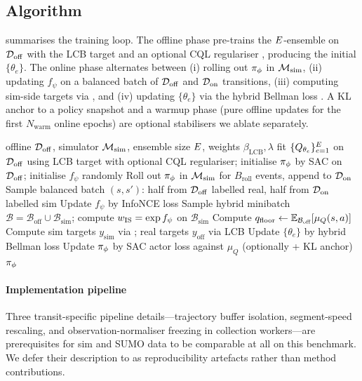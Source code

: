 \subsection{Algorithm}
\label{sec:method:algo}

 summarises the training loop.
The offline phase pre-trains the $E$-ensemble on $\mathcal{D}_{\mathrm{off}}$ with the LCB target and an optional CQL regulariser \citep{kumar2020cql}, producing the initial $\{\theta_e\}$.
The online phase alternates between (i) rolling out $\pi_\phi$ in $\mathcal{M}_{\mathrm{sim}}$, (ii) updating $f_\psi$ on a balanced batch of $\mathcal{D}_{\mathrm{off}}$ and $\mathcal{D}_{\mathrm{on}}$ transitions, (iii) computing sim-side targets via , and (iv) updating $\{\theta_e\}$ via the hybrid Bellman loss .
A KL anchor to a policy snapshot \citep{zhou2024wsrl} and a warmup phase (pure offline updates for the first $N_{\text{warm}}$ online epochs) are optional stabilisers we ablate separately.

\begin{algorithm}[t]
\caption{H2O+ training loop (generic). The IS-weight estimator $\wis$ is one of \{TransitionDisc, DynamicsDisc, Contrastive InfoNCE\}; the bootstrap offline-Q floor in $y_{\text{sim}}$ is optional.  reports which combination is preferred under which fidelity gap.}
\label{alg:main}
\begin{algorithmic}[1]
\REQUIRE offline $\mathcal{D}_{\mathrm{off}}$, simulator $\mathcal{M}_{\mathrm{sim}}$, ensemble size $E$, weights $\beta_{\text{LCB}}, \lambda$
 fit $\{Q_{\theta_e}\}_{e=1}^{E}$ on $\mathcal{D}_{\mathrm{off}}$ using LCB target with optional CQL regulariser; initialise $\pi_\phi$ by SAC on $\mathcal{D}_{\mathrm{off}}$; initialise $f_\psi$ randomly
  \STATE Roll out $\pi_\phi$ in $\mathcal{M}_{\mathrm{sim}}$ for $B_{\text{roll}}$ events, append to $\mathcal{D}_{\mathrm{on}}$
  \STATE Sample balanced batch $(s, s')$: half from $\mathcal{D}_{\mathrm{off}}$ labelled real, half from $\mathcal{D}_{\mathrm{on}}$ labelled sim
  \STATE Update $f_\psi$ by InfoNCE loss 
  \STATE Sample hybrid minibatch $\mathcal{B} = \mathcal{B}_{\text{off}} \cup \mathcal{B}_{\text{sim}}$; compute $w_{\mathrm{IS}} = \exp f_\psi$ on $\mathcal{B}_{\text{sim}}$
  \STATE Compute $q_{\text{floor}} \leftarrow \mathbb{E}_{\mathcal{B}_{\text{off}}}[\mu_Q(s, a)]$
  \STATE Compute sim targets $y_{\text{sim}}$ via ; real targets $y_{\text{off}}$ via LCB
  \STATE Update $\{\theta_e\}$ by hybrid Bellman loss 
  \STATE Update $\pi_\phi$ by SAC actor loss against $\mu_Q$ (optionally + KL anchor)
\ENDFOR
\RETURN $\pi_\phi$
\end{algorithmic}
\end{algorithm}

\paragraph{Implementation pipeline}
Three transit-specific pipeline details---trajectory buffer isolation, segment-speed rescaling, and observation-normaliser freezing in collection workers---are prerequisites for sim and SUMO data to be comparable at all on this benchmark.
We defer their description to  as reproducibility artefacts rather than method contributions.
